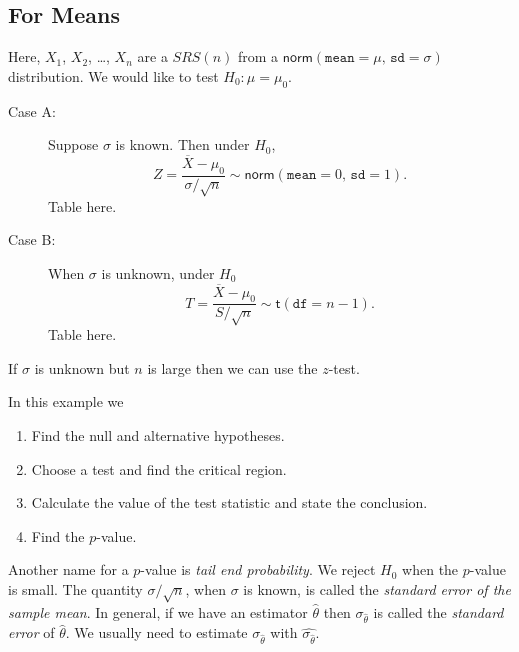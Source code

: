 \documentclass[captions=tableheading]{scrbook}
\begin{document}
\label{sec:One-Sample-Tests}
\subsection{For Means}
\label{sec-10-2-1}


Here, \(X_{1}\), \(X_{2}\), \ldots{}, \(X_{n}\) are a \(SRS(n)\) from a \(\mathsf{norm}(\mathtt{mean}=\mu,\,\mathtt{sd}=\sigma)\) distribution. We would like to test \(H_{0}:\mu=\mu_{0}\).

\begin{description}
\item[Case A:] Suppose \(\sigma\) is known. Then under \(H_{0}\),
   \[
   Z=\frac{\overline{X}-\mu_{0}}{\sigma/\sqrt{n}}\sim\mathsf{norm}(\mathtt{mean}=0,\,\mathtt{sd}=1).
   \]
   Table here.
\item[Case B:] When \(\sigma\) is unknown, under \(H_{0}\)
   \[
   T = \frac{\overline{X}-\mu_{0}}{S/\sqrt{n}}\sim\mathsf{t}(\mathtt{df}=n-1).
   \]
   Table here.
\end{description}


\begin{rem}
If \(\sigma\) is unknown but \(n\) is large then we can use the \(z\)-test.
\end{rem}

\begin{example}
In this example we
\begin{enumerate}
\item Find the null and alternative hypotheses.
\item Choose a test and find the critical region.
\item Calculate the value of the test statistic and state the conclusion.
\item Find the \(p\)-value.
\end{enumerate}

\end{example}

\begin{rem}
Another name for a \(p\)-value is \emph{tail end probability}. We reject \(H_{0}\) when the \(p\)-value is small.
The quantity \(\sigma/\sqrt{n}\), when \(\sigma\) is known, is called the \emph{standard error of the sample mean}. In general, if we have an estimator \(\hat{\theta}\) then \(\sigma_{\hat{\theta}}\) is called the \emph{standard error} of \(\hat{\theta}\). We usually need to estimate \(\sigma_{\hat{\theta}}\) with \(\hat{\sigma_{\hat{\theta}}}\).
\end{rem}
\end{document}
